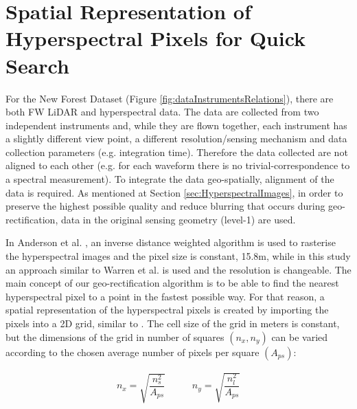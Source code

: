 \documentclass{subfiles}
\begin{document}
	
	
	

	


	
\section{Spatial Representation of Hyperspectral Pixels for Quick Search}\label{sec:SpatialRepresentation}


	\par For the New Forest Dataset (Figure \ref{fig:dataInstrumentsRelations}), there are both FW LiDAR and hyperspectral data. The data are collected from two independent instruments and, while they are flown together, each instrument has a slightly different view point, a different resolution/sensing mechanism and data collection parameters (e.g. integration time).  Therefore the data collected are not aligned to each other (e.g. for each waveform there is no trivial-correspondence to a spectral measurement). To integrate the data geo-spatially, alignment of the data is required.  As mentioned at Section \ref{sec:HyperspectralImages}, in order to preserve the highest possible quality and reduce blurring that occurs during geo-rectification, data in the original sensing geometry (level-1) are used.
	
	\par In Anderson et al. \cite{Anderson2008}, an inverse distance weighted algorithm is used to rasterise the hyperspectral images and the pixel size is constant, 15.8m, while in this study an approach similar to Warren et al. \cite{Warren2014} is used and the resolution is changeable. The main concept of our geo-rectification algorithm is to be able to find the nearest hyperspectral pixel to a point in the fastest possible way. For that reason, a spatial representation of the hyperspectral pixels is created by importing the pixels into a 2D grid, similar to \cite{Warren2014}. The cell size of the grid in meters is constant, but the dimensions of the grid in number of squares $(n_x, n_y)$ can be varied according to the chosen average number of pixels per square $(A_{ps})$: 
	
	\begin{eqnarray}
		n_x=\sqrt{\dfrac{n_s^2}{A_{ps}}} \;\;\;\;\;\;\;\;\;\; n_y=\sqrt{\dfrac{n_l^2}{A_{ps}}}   
	\end{eqnarray} 
	
\end{document}
